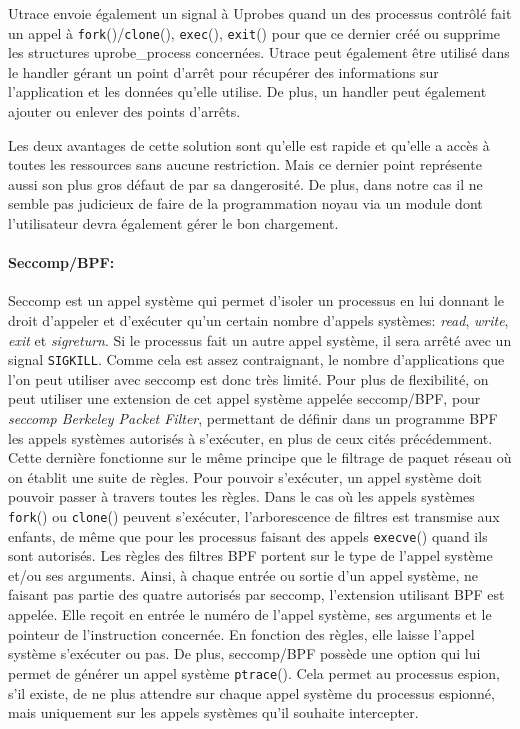 Utrace envoie également un signal à Uprobes quand un des processus contrôlé fait
un appel à \texttt{fork}()/\texttt{clone}(), \texttt{exec}(), \texttt{exit}()
pour que ce dernier créé ou supprime les structures uprobe\_process
concernées. Utrace peut également être utilisé dans le handler gérant un point
d'arrêt pour récupérer des informations sur l'application et les données qu'elle
utilise. De plus, un handler peut également ajouter ou enlever des points
d'arrêts.

Les deux avantages de cette solution sont qu'elle est rapide et qu'elle a accès
à toutes les ressources sans aucune restriction. Mais ce dernier point
représente aussi son plus gros défaut de par sa dangerosité. De plus, dans notre
cas il ne semble pas judicieux de faire de la programmation noyau via un module
dont l'utilisateur devra également gérer le bon chargement.

\paragraph{Seccomp/BPF:}

Seccomp \citet{seccompbpf} est un appel système qui permet d'isoler un processus
en lui donnant le droit d'appeler et d'exécuter qu'un certain nombre d'appels
systèmes: \textit{read}, \textit{write}, \textit{exit} et \textit{sigreturn}. Si
le processus fait un autre appel système, il sera arrêté avec un signal
\texttt{SIGKILL}. Comme cela est assez contraignant, le nombre d'applications
que l'on peut utiliser avec seccomp est donc très limité. Pour plus de
flexibilité, on peut utiliser une extension de cet appel système appelée
seccomp/BPF, pour \textit{seccomp Berkeley Packet Filter}, permettant de définir
dans un programme BPF \citet{bpf} les appels systèmes autorisés à s'exécuter, en
plus de ceux cités précédemment. Cette dernière fonctionne sur le même principe
que le filtrage de paquet réseau où on établit une suite de règles. Pour pouvoir
s'exécuter, un appel système doit pouvoir passer à travers toutes les
règles. Dans le cas où les appels systèmes \texttt{fork}() ou \texttt{clone}()
peuvent s'exécuter, l'arborescence de filtres est transmise aux enfants, de même
que pour les processus faisant des appels \texttt{execve}() quand ils sont
autorisés. Les règles des filtres BPF portent sur le type de l'appel système
et/ou ses arguments. Ainsi, à chaque entrée ou sortie d'un appel système, ne
faisant pas partie des quatre autorisés par seccomp, l'extension utilisant BPF
est appelée. Elle reçoit en entrée le numéro de l'appel système, ses arguments
et le pointeur de l'instruction concernée. En fonction des règles, elle laisse
l'appel système s'exécuter ou pas.  De plus, seccomp/BPF possède une option qui
lui permet de générer un appel système \texttt{ptrace}(). Cela permet au
processus espion, s'il existe, de ne plus attendre sur chaque appel système du
processus espionné, mais uniquement sur les appels systèmes qu'il souhaite
intercepter.

